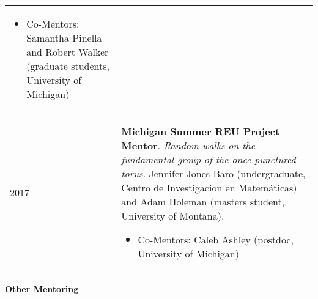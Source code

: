 \begin{center}
{\begin{longtable}{p{}  p{}}
        {\small
        \begin{itemize}
        \setlength{\parindent}{0em}
        \item[] 
            Co-Mentors: Samantha Pinella and Robert Walker (graduate students, University of Michigan) 
        \end{itemize}
        }
        \vspace{-1em}
         \\ 
   2017 & \textbf{Michigan Summer REU  Project Mentor}. \textit{Random walks on the fundamental group of the once punctured torus}.  Jennifer Jones-Baro (undergraduate, Centro de Investigacion en Matem\'aticas) and Adam Holeman (masters student, University of Montana). 
        \hspace{-1em}

        {\small
        \begin{itemize}
        \setlength{\parindent}{0em}
        \item[] 
            Co-Mentors: Caleb Ashley (postdoc, University of Michigan) 
        \end{itemize}
        }
        \vspace{-1em}
         
    \end{longtable}
    } 
    \end{center}

    \vspace{-1em}
    

    \textbf{\large Other Mentoring}
    
